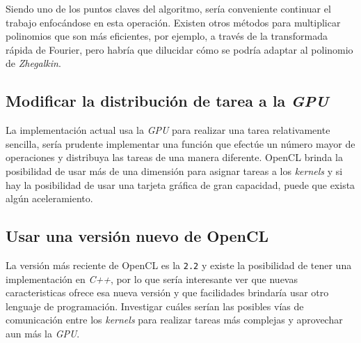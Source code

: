 Siendo uno de los puntos claves del algoritmo, sería conveniente continuar el trabajo enfocándose en esta operación. Existen otros métodos para multiplicar polinomios que son más eficientes, por ejemplo, a través de la transformada rápida de Fourier\cite{fft}, pero habría que dilucidar cómo se podría adaptar al polinomio de \textit{Zhegalkin}.

\subsection{Modificar la distribución de tarea a la \textit{GPU}}

La implementación actual usa la \textit{GPU} para realizar una tarea relativamente sencilla, sería prudente implementar una función que efectúe un número mayor de operaciones y distribuya las tareas de una manera diferente. OpenCL brinda la posibilidad de usar más de una dimensión para asignar tareas a los \textit{kernels} y si hay la posibilidad de usar una tarjeta gráfica de gran capacidad, puede que exista algún aceleramiento.

\subsection{Usar una versión nuevo de OpenCL}

La versión más reciente de OpenCL es la \texttt{2.2} y existe la posibilidad de tener una implementación en \textit{C++}, por lo que sería interesante ver que nuevas caracteristicas ofrece esa nueva versión y que facilidades brindaría usar otro lenguaje de programación. Investigar cuáles serían las posibles vías de comunicación entre los \textit{kernels} para realizar tareas más complejas y aprovechar aun más la \textit{GPU}.